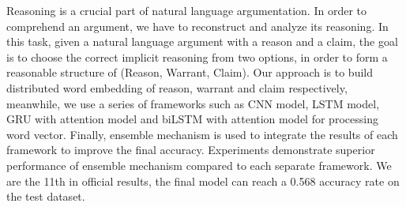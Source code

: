 Reasoning is a crucial part of natural language argumentation. In order to comprehend an argument, we have to reconstruct and analyze its reasoning. In this task, given a natural language argument with a reason and a claim, the goal is to choose the correct implicit reasoning from two options, in order to form a reasonable structure of (Reason, Warrant, Claim). Our approach is to build distributed word embedding of reason, warrant and claim respectively, meanwhile, we use a series of frameworks such as CNN model, LSTM model, GRU with attention model and biLSTM with attention model for processing word vector. Finally, ensemble mechanism is used to integrate the results of each framework to improve the final accuracy. Experiments demonstrate superior performance of ensemble mechanism compared to each separate framework. We are the 11th in official results, the final model can reach a 0.568 accuracy rate on the test dataset.
